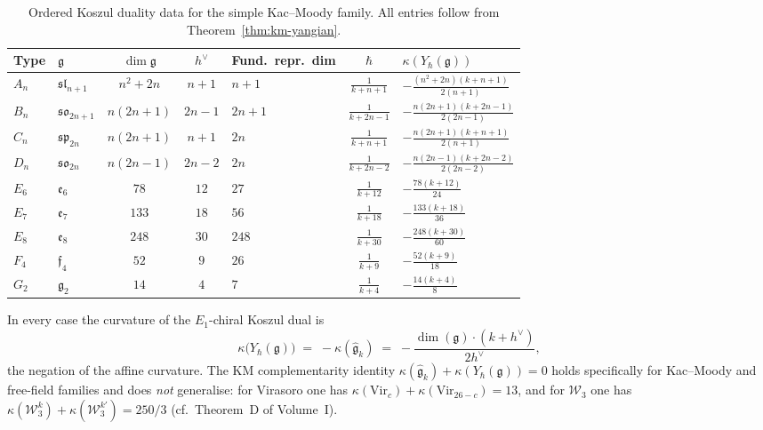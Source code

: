 \begin{table}[ht]
\centering
\caption{Ordered Koszul duality data for the simple
Kac--Moody family. All entries follow from
Theorem~\textup{\ref{thm:km-yangian}}.}
\label{tab:km-yangian-data}
\renewcommand{\arraystretch}{1.3}
\begin{tabular}{@{}llcclcl@{}}
\toprule
Type & $\mathfrak{g}$ & $\dim\mathfrak{g}$ & $h^\vee$
 & Fund.\ repr.\ dim & $\hbar$ & $\kappa(Y_\hbar(\mathfrak{g}))$ \\
\midrule
$A_n$ & $\mathfrak{sl}_{n+1}$ & $n^2+2n$ & $n+1$
 & $n+1$ & $\frac{1}{k+n+1}$
 & $-\frac{(n^2+2n)(k+n+1)}{2(n+1)}$ \\[4pt]
$B_n$ & $\mathfrak{so}_{2n+1}$ & $n(2n+1)$ & $2n-1$
 & $2n+1$ & $\frac{1}{k+2n-1}$
 & $-\frac{n(2n+1)(k+2n-1)}{2(2n-1)}$ \\[4pt]
$C_n$ & $\mathfrak{sp}_{2n}$ & $n(2n+1)$ & $n+1$
 & $2n$ & $\frac{1}{k+n+1}$
 & $-\frac{n(2n+1)(k+n+1)}{2(n+1)}$ \\[4pt]
$D_n$ & $\mathfrak{so}_{2n}$ & $n(2n-1)$ & $2n-2$
 & $2n$ & $\frac{1}{k+2n-2}$
 & $-\frac{n(2n-1)(k+2n-2)}{2(2n-2)}$ \\[4pt]
$E_6$ & $\mathfrak{e}_6$ & $78$ & $12$
 & $27$ & $\frac{1}{k+12}$
 & $-\frac{78(k+12)}{24}$ \\[4pt]
$E_7$ & $\mathfrak{e}_7$ & $133$ & $18$
 & $56$ & $\frac{1}{k+18}$
 & $-\frac{133(k+18)}{36}$ \\[4pt]
$E_8$ & $\mathfrak{e}_8$ & $248$ & $30$
 & $248$ & $\frac{1}{k+30}$
 & $-\frac{248(k+30)}{60}$ \\[4pt]
$F_4$ & $\mathfrak{f}_4$ & $52$ & $9$
 & $26$ & $\frac{1}{k+9}$
 & $-\frac{52(k+9)}{18}$ \\[4pt]
$G_2$ & $\mathfrak{g}_2$ & $14$ & $4$
 & $7$ & $\frac{1}{k+4}$
 & $-\frac{14(k+4)}{8}$ \\
\bottomrule
\end{tabular}
\end{table}

\noindent
In every case the curvature of the $E_1$-chiral Koszul dual is
\begin{equation}\label{eq:km-yangian-curvature}
\kappa\bigl(Y_\hbar(\mathfrak{g})\bigr)
\;=\;
-\kappa(\widehat{\mathfrak{g}}_k)
\;=\;
-\frac{\dim(\mathfrak{g})\cdot(k+h^\vee)}{2h^\vee},
\end{equation}
the negation of the affine curvature. The KM complementarity
identity $\kappa(\widehat{\mathfrak{g}}_k) + \kappa(Y_\hbar(\mathfrak{g})) = 0$
holds specifically for Kac--Moody and free-field families and
does \emph{not} generalise: for Virasoro one has
$\kappa(\mathrm{Vir}_c) + \kappa(\mathrm{Vir}_{26-c}) = 13$, and for
$\mathcal{W}_3$ one has
$\kappa(\mathcal{W}_3^k) + \kappa(\mathcal{W}_3^{k'}) = 250/3$
(cf.\ Theorem~D of Volume~I).

